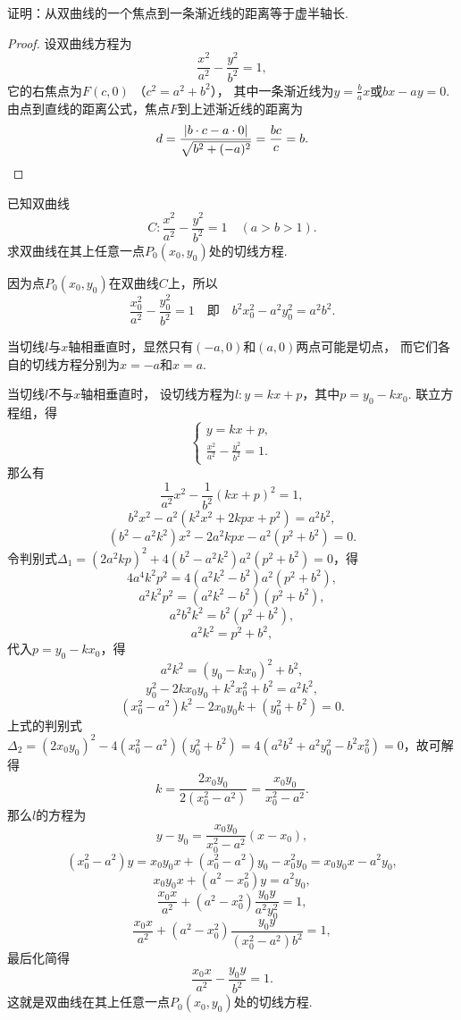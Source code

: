 \begin{example}
证明：从双曲线的一个焦点到一条渐近线的距离等于虚半轴长.
\begin{proof}
设双曲线方程为\[
	\frac{x^2}{a^2}-\frac{y^2}{b^2}=1,
\]
它的右焦点为\(F(c,0)\)
（\(c^2=a^2+b^2\)），
其中一条渐近线为\(y=\frac{b}{a}x\)或\(bx-ay=0\).
由点到直线的距离公式，焦点\(F\)到上述渐近线的距离为\[
	d = \frac{\abs{b \cdot c - a \cdot 0}}{\sqrt{b^2+(-a)^2}}
	= \frac{bc}{c} = b.
	\qedhere
\]
\end{proof}
\end{example}

\begin{example}
已知双曲线\[
C: \frac{x^2}{a^2} - \frac{y^2}{b^2} = 1 \quad(a>b>1).
\]求双曲线在其上任意一点\(P_0(x_0,y_0)\)处的切线方程.
\begin{solution}
因为点\(P_0(x_0,y_0)\)在双曲线\(C\)上，所以\[
\frac{x_0^2}{a^2} - \frac{y_0^2}{b^2} = 1
\quad\text{即}\quad
b^2 x_0^2 - a^2 y_0^2 = a^2 b^2.
\]

当切线\(l\)与\(x\)轴相垂直时，显然只有\((-a,0)\)和\((a,0)\)两点可能是切点，
而它们各自的切线方程分别为\(x=-a\)和\(x=a\).

当切线\(l\)不与\(x\)轴相垂直时，
设切线方程为\(l: y = kx + p\)，其中\(p = y_0 - k x_0\).
联立方程组，得\[
\begin{cases}
y = kx + p, \\
\frac{x^2}{a^2} - \frac{y^2}{b^2} = 1.
\end{cases}
\]那么有\[
\frac{1}{a^2} x^2 - \frac{1}{b^2} (kx+p)^2 = 1,
\]\[
b^2 x^2 - a^2 (k^2 x^2 + 2kpx + p^2) = a^2 b^2,
\]\[
(b^2 - a^2 k^2) x^2 - 2 a^2 k p x - a^2 (p^2 + b^2) = 0.
\]令判别式\(\Delta_1 = (2 a^2 k p)^2 + 4 (b^2 - a^2 k^2) a^2 (p^2 + b^2) = 0\)，得\[
4 a^4 k^2 p^2 = 4 (a^2 k^2 - b^2) a^2 (p^2 + b^2),
\]\[
a^2 k^2 p^2 = (a^2 k^2 - b^2)(p^2 + b^2),
\]\[
a^2 b^2 k^2 = b^2(p^2 + b^2),
\]\[
a^2 k^2 = p^2 + b^2,
\]
代入\(p = y_0 - k x_0\)，得\[
a^2 k^2 = (y_0 - k x_0)^2 + b^2,
\]\[
y_0^2 - 2k x_0 y_0 + k^2 x_0^2 + b^2 = a^2 k^2,
\]\[
(x_0^2 - a^2) k^2 - 2 x_0 y_0 k + (y_0^2 + b^2) = 0.
\]上式的判别式\(\Delta_2 = (2 x_0 y_0)^2 - 4(x_0^2 - a^2)(y_0^2 + b^2)
= 4(a^2 b^2 + a^2 y_0^2 - b^2 x_0^2) = 0\)，故可解得\[
k = \frac{2 x_0 y_0}{2 (x_0^2 - a^2)}
= \frac{x_0 y_0}{x_0^2 - a^2}.
\]那么\(l\)的方程为\[
y - y_0 = \frac{x_0 y_0}{x_0^2 - a^2} (x - x_0),
\]\[
(x_0^2 - a^2) y = x_0 y_0 x + (x_0^2 - a^2) y_0 - x_0^2 y_0
= x_0 y_0 x - a^2 y_0,
\]\[
x_0 y_0 x + (a^2 - x_0^2) y = a^2 y_0,
\]\[
\frac{x_0 x}{a^2} + (a^2 - x_0^2) \frac{y_0 y}{a^2 y_0^2} = 1,
\]\[
\frac{x_0 x}{a^2} + (a^2 - x_0^2) \frac{y_0 y}{(x_0^2 - a^2) b^2} = 1,
\]最后化简得\begin{equation}\label{equation:解析几何.双曲线的切线}
\frac{x_0 x}{a^2} - \frac{y_0 y}{b^2} = 1.
\end{equation}
这就是双曲线在其上任意一点\(P_0(x_0,y_0)\)处的切线方程.
\end{solution}
\end{example}

